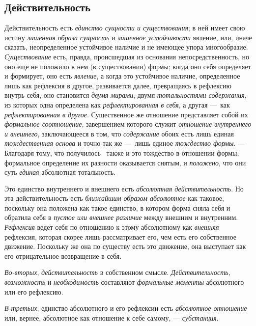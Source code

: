 \clearpage\setcounter{page}{1}\subsection[Третий
отделДействительность]{\newline
Действительность}
\hypertarget{Toc478978758}{}Действительность есть
{\em единство сущности и существования}; в ней имеет
свою истину {\em лишенная образа сущность} и
{\em лишенное устойчивости} явление, или, иначе
сказать, неопределенное устойчивое наличие и не имеющее упора многообразие.
{\em Существование} есть, правда, происшедшая из
основания непосредственность, но оно еще не положило в нем (в
существовании) формы; когда оно себя определяет и формирует, оно есть
{\em явление}, а когда это устойчивое наличие,
определенное лишь как рефлексия в другое, развивается далее, превращаясь в
рефлексию внутрь себя, оно становится {\em двумя
мирами}, двумя {\em тотальностями содержания}, из
которых одна определена как {\em рефлектированная в
себя}, а другая —~как {\em рефлектированная в другое}.
Существенное же отношение представляет собой их
{\em формальное соотношение}, завершением которого
служит {\em отношение внутреннего и внешнего},
заключающееся в том, что {\em содержание} обоих есть
лишь единая {\em тождественная основа} и точно так же
—~лишь единое {\em тождество формы}. — Благодаря тому,
что получилось \ также и это тождество в отношении формы, формальное
определение их разности оказывается снятым, и
{\em положено}, что они суть
{\em единая} абсолютная тотальность.

Это единство внутреннего и внешнего есть {\em абсолютная
действительность}. Но эта действительность есть
{\em ближайшим образом абсолютное} как таковое,
поскольку она положена как такое единство, в котором форма сняла себя и
обратила себя в {\em пустое или внешнее различие} между
внешним и внутренним. {\em Рефлексия} ведет себя по
отношению к этому абсолютному как {\em внешняя}
рефлексия, которая скорее лишь рассматривает его, чем есть его собственное
движение. Поскольку же она по существу есть это движение, она выступает как
его отрицательное возвращение в себя.

{\em Во-вторых},
{\em действительность} в собственном смысле.
{\em Действительность},
{\em возможность} и
{\em необходимость} составляют
{\em формальные моменты} абсолютного или его рефлексию.

{\em В-третьих}, единство абсолютного и его рефлексии
есть {\em абсолютное отношение} или, вернее, абсолютное
как отношение к себе самому, — {\em субстанция}.

